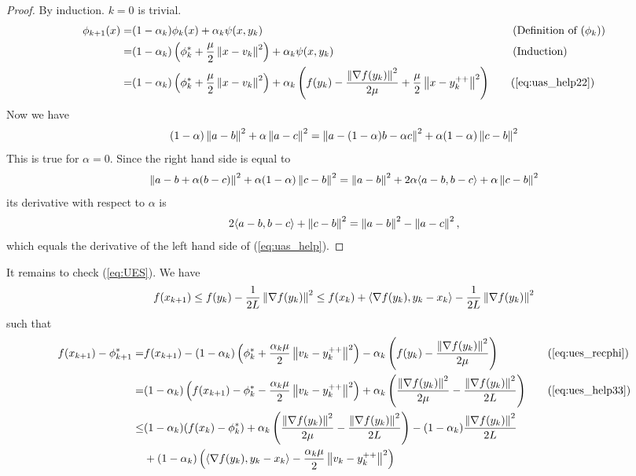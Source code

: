 \documentclass[12pt,english]{article}
\begin{document}
%
\begin{proof}
By induction. $k=0$ is trivial.
%
\begin{align*}
\phi_{k+1}(x) =& (1-\alpha_k)\phi_k(x) + \alpha_k \psi(x, y_k) &\quad&\left(\mbox{Definition of $(\phi_k)$}\right)\\
=& (1-\alpha_k)\left(\phi_{k}^* + \frac{\mu}{2}\left\|x-v_{k}\right\|^2\right) + \alpha_k \psi(x, y_k) &\quad&\left(\mbox{Induction}\right)\\
=& (1-\alpha_k)\left(\phi_{k}^* + \frac{\mu}{2}\left\|x-v_{k}\right\|^2\right) + \alpha_k \left( f(y_k) - \frac{\left\|\nabla f(y_k)\right\|^2}{2\mu} + \frac{\mu}{2}\left\|x-y_k^{++}\right\|^2\right) &\quad&(\ref{eq:uas_help22})
\end{align*}
%
Now we have
%
%
\begin{equation}\label{eq:uas_help}
(1-\alpha)\left\|a-b\right\|^2 + \alpha\left\|a-c\right\|^2 = \left\|a - (1-\alpha)b-\alpha c\right\|^2 + \alpha(1-\alpha)\left\|c-b\right\|^2
\end{equation}
%
This is true for $\alpha=0$.
Since the right hand side is equal to
%
\begin{align*}
\left\|a - b + \alpha(b-c)\right\|^2 + \alpha(1-\alpha)\left\|c-b\right\|^2 
= \left\|a - b\right\|^2 + 2\alpha\langle a-b,b-c\rangle+\alpha\left\|c-b\right\|^2 
\end{align*}
%
its derivative with respect to $\alpha$ is
%
\begin{align*}
2\langle a-b,b-c\rangle+\left\|c-b\right\|^2  = \left\|a-b\right\|^2 - \left\|a-c\right\|^2,
\end{align*}
%
which equals the derivative of the left hand side of (\ref{eq:uas_help}).
%
\end{proof}
%
It remains to check (\ref{eq:UES}).
%
%
We have
%
%
\begin{equation}\label{eq:ues_help33}
f(x_{k+1}) \le f(y_{k}) -  \frac{1}{2L}\left\|\nabla f(y_k)\right\|^2 \le f(x_k) + \langle\nabla f(y_k),y_k - x_k\rangle -  \frac{1}{2L}\left\|\nabla f(y_k)\right\|^2
\end{equation}
%
such that
%
\begin{align*}
f(x_{k+1})-\phi^*_{k+1}=& f(x_{k+1}) -(1-\alpha_k)\left(\phi_{k}^* + \frac{\alpha_k\mu}{2}\norm{v_k-y_k^{++}}^2\right) -\alpha_k\left(f(y_k) - \frac{\norm{\nabla f(y_k)}^2}{2\mu}\right)&\quad&\mbox{(\ref{eq:ues_recphi})}\\
%
=& (1-\alpha_k)\left(f(x_{k+1}) -\phi^*_k-\frac{\alpha_k\mu}{2}\norm{v_k-y_k^{++}}^2\right) + \alpha_k\left( \frac{\norm{\nabla f(y_k)}^2}{2\mu}-\frac{\norm{\nabla f(y_k)}^2}{2L}\right)&\quad&(\ref{eq:ues_help33})\\
%
\le& (1-\alpha_k)(f(x_k)-\phi_{k}^*)+ \alpha_k\left( \frac{\norm{\nabla f(y_k)}^2}{2\mu}-\frac{\norm{\nabla f(y_k)}^2}{2L}\right)-(1-\alpha_k)\frac{\norm{\nabla f(y_k)}^2}{2L}\\
&+ (1-\alpha_k)\left(\scp{\nabla f(y_k)}{y_k - x_k} -  \frac{\alpha_k\mu}{2}\norm{v_k-y_k^{++}}^2\right)
\end{align*}
\end{document}
